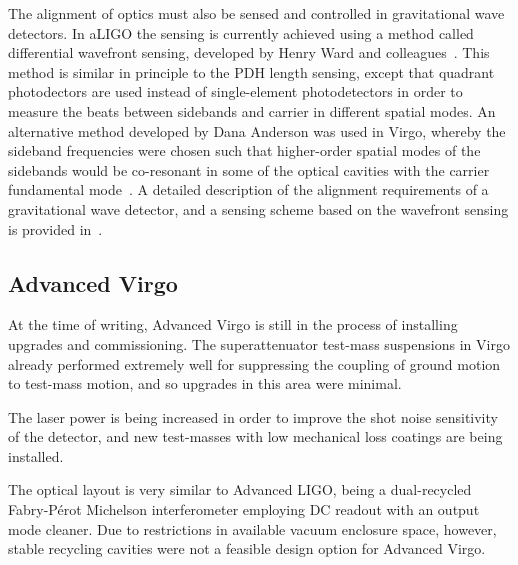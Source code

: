 The alignment of optics must also be sensed and controlled in gravitational wave detectors. In aLIGO the sensing is currently achieved using a method 
called differential wavefront sensing, developed by Henry Ward and colleagues~\cite{Morrison1994, Morrison1994b}. 
This method is similar in principle to the PDH length sensing, 
except that quadrant photodectors are used 
instead of single-element photodetectors in order to measure the beats between sidebands and carrier in different spatial modes. An 
alternative method developed by Dana Anderson was used in Virgo, whereby the sideband frequencies were chosen such that higher-order 
spatial modes of the sidebands would be co-resonant in some of the optical cavities with the carrier fundamental mode~\cite{Anderson1984}. 
A detailed description of the alignment requirements of a gravitational wave detector, and a sensing scheme based on the wavefront sensing 
is provided in~\cite{Fritschel1998}.

\subsection{Advanced Virgo}
At the time of writing, Advanced Virgo is still in the process of installing upgrades and commissioning. 
The superattenuator test-mass suspensions in Virgo already performed extremely well for suppressing the coupling of ground motion to test-mass motion, and so upgrades in this area were minimal.

The laser power is being increased in order to improve the shot noise sensitivity of the detector, and new test-masses with low mechanical loss coatings are being installed.

The optical layout is very similar to Advanced LIGO, being a dual-recycled Fabry-P\'{e}rot Michelson interferometer employing DC readout with an output mode cleaner.
Due to restrictions in available vacuum enclosure space, however, stable recycling cavities were not a feasible design option for Advanced Virgo. 


